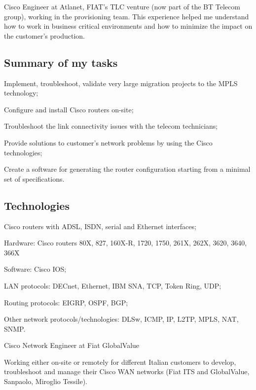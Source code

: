 \noindent
Cisco Engineer at Atlanet, FIAT's TLC venture (now part of the BT Telecom group), 
working in the provisioning team.
This experience helped me understand how to work in business critical environments 
and how to minimize the impact on the customer's production.

\subsection{Summary of my tasks}

\item{\bdot} Implement, troubleshoot, validate very large migration projects
   to the MPLS technology;
\item{\bdot} Configure and install Cisco routers on-site;
\item{\bdot} Troubleshoot the link connectivity issues with the telecom technicians;
\item{\bdot} Provide solutions to customer's network problems by using the Cisco
   technologies;
\item{\bdot} Create a software for generating the router configuration starting
   from a minimal set of specifications.

\subsection{Technologies}

\item{\bdot} Cisco routers with ADSL, ISDN, serial and Ethernet interfaces;
\item{\bdot} Hardware: Cisco routers 80X, 827, 160X-R, 1720, 1750, 261X, 
   262X, 3620, 3640, 366X
\item{\bdot} Software: Cisco IOS;
\item{\bdot} LAN protocols: DECnet, Ethernet, IBM SNA, TCP, Token Ring, UDP;
\item{\bdot} Routing protocols: EIGRP, OSPF, BGP;
\item{\bdot} Other network protocols/technologies: DLSw, ICMP, IP, L2TP, 
   MPLS, NAT, SNMP.


\bigskip
{}
   {Cisco Network Engineer at Fiat GlobalValue}

\noindent
Working either on-site or remotely for different Italian customers to develop,
troubleshoot and manage their Cisco WAN networks (Fiat ITS and GlobalValue, 
Sanpaolo, Miroglio Tessile).

